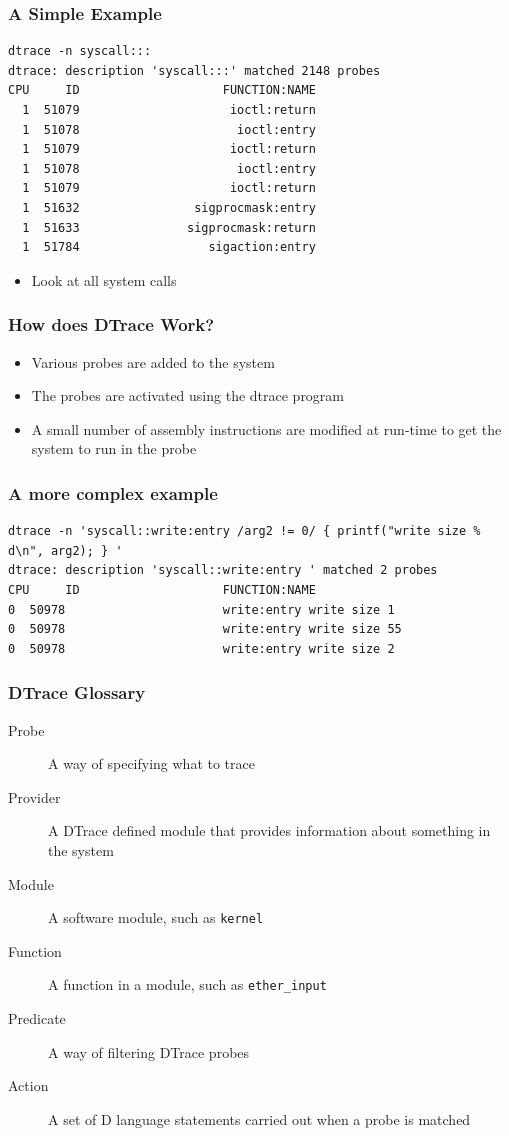\documentclass[pdftex]{beamer} %
\begin{document}
\begin{frame}[fragile]
  \frametitle{A Simple Example}
  \begin{lstlisting}
dtrace -n syscall:::
dtrace: description 'syscall:::' matched 2148 probes
CPU     ID                    FUNCTION:NAME
  1  51079                     ioctl:return 
  1  51078                      ioctl:entry 
  1  51079                     ioctl:return 
  1  51078                      ioctl:entry 
  1  51079                     ioctl:return 
  1  51632                sigprocmask:entry 
  1  51633               sigprocmask:return 
  1  51784                  sigaction:entry 
  \end{lstlisting}
  \begin{itemize}
  \item Look at all system calls
  \end{itemize}
\end{frame}

\begin{frame}
  \frametitle{How does DTrace Work?}
  \begin{itemize}
  \item Various probes are added to the system
  \item The probes are activated using the dtrace program
  \item A small number of assembly instructions are modified at
    run-time to get the system to run in the probe
  \end{itemize}
\end{frame}

\begin{frame}[fragile]
  \frametitle{A more complex example}
\begin{lstlisting}
dtrace -n 'syscall::write:entry /arg2 != 0/ { printf("write size % d\n", arg2); } '
dtrace: description 'syscall::write:entry ' matched 2 probes
CPU     ID                    FUNCTION:NAME
0  50978                      write:entry write size 1
0  50978                      write:entry write size 55
0  50978                      write:entry write size 2
\end{lstlisting}
\end{frame}

\begin{frame}[fragile]
  \frametitle{DTrace Glossary}
  \begin{description}
  \item[Probe] A way of specifying what to trace
  \item[Provider] A DTrace defined module that provides information
    about something in the system
  \item[Module] A software module, such as \Verb+kernel+
  \item[Function] A function in a module, such as \Verb+ether_input+
  \item[Predicate] A way of filtering DTrace probes
  \item[Action] A set of D language statements carried out when a probe
    is matched
  \end{description}
\end{frame}
\end{document}
